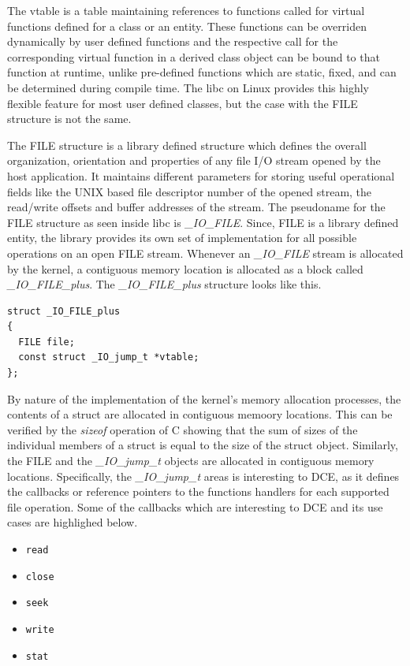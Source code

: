 \documentclass{sig-alternate}
\begin{document}
The vtable is a table maintaining references to functions called for virtual functions defined for a class or an entity. These functions can 
be overriden dynamically by user defined functions and the respective call for the corresponding virtual function in a derived class object can be bound 
to that function at runtime, unlike pre-defined functions which are static, fixed, and can be determined during compile time. The libc on Linux provides
this highly flexible feature for most user defined classes, but the case with the FILE structure is not the same.

The FILE structure is a library defined structure which defines the overall organization, orientation and properties of any file I/O stream opened
by the host application. It maintains different parameters for storing useful operational fields like the UNIX based file descriptor number of the 
opened stream, the read/write offsets and buffer addresses of the stream. The pseudoname for the FILE structure as seen inside libc is \textit{\_IO\_FILE}. 
Since, FILE is a library defined entity, the library provides its own set of implementation for all possible operations on an open FILE stream.
Whenever an \textit{\_IO\_FILE} stream is allocated by the kernel, a contiguous memory location is allocated as a block called \textit{\_IO\_FILE\_plus}. 
The \textit{\_IO\_FILE\_plus} structure looks like this.

\begin{lstlisting}[style=CStyle]     
struct _IO_FILE_plus
{
  FILE file;
  const struct _IO_jump_t *vtable;
};
\end{lstlisting}

By nature of the implementation of the kernel's memory allocation processes, the contents of a struct are allocated in contiguous memoory locations. 
This can be verified by the \textit{sizeof} operation of C showing that the sum of sizes of the individual members of a struct is equal to the size of
the struct object. Similarly, the FILE and the \textit{\_IO\_jump\_t} objects are allocated in contiguous memory locations. Specifically, the 
\textit{\_IO\_jump\_t} areas is interesting to DCE, as it defines the callbacks or reference pointers to the functions handlers for each supported file 
operation. Some of the callbacks which are interesting to DCE and its use cases are highlighed below.

\begin{multicols}{2}
\begin{itemize}
  \item \texttt{read}
  \item \texttt{close}
  \item \texttt{seek}
  \item \texttt{write}
  \item \texttt{stat}
\end{itemize}
\end{multicols}
\end{document}
